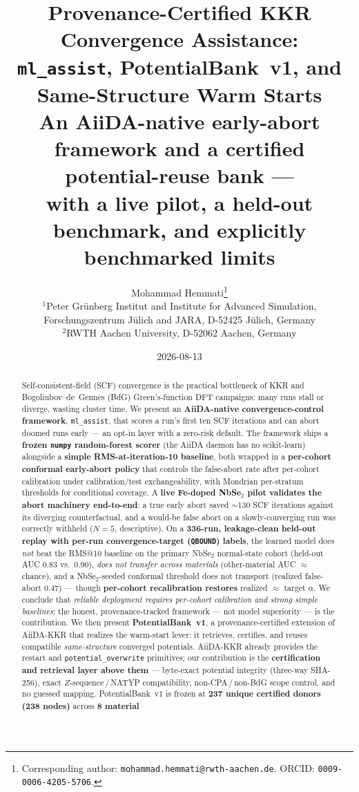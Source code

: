 \documentclass[11pt]{article}
\title{\textbf{Provenance-Certified KKR Convergence Assistance:\\
\texttt{ml\_assist}, PotentialBank~v1, and Same-Structure Warm Starts}\\[3pt]
\large An AiiDA-native early-abort framework and a certified potential-reuse bank ---\\
with a live pilot, a held-out benchmark, and explicitly benchmarked limits}
\author{%
Mohammad Hemmati\thanks{Corresponding author: \texttt{mohammad.hemmati@rwth-aachen.de}.
ORCID: \texttt{0009-0006-4205-5706}.}\\[2pt]
\small $^{1}$Peter Gr\"unberg Institut and Institute for Advanced Simulation, Forschungszentrum J\"ulich and
JARA, D-52425 J\"ulich, Germany\\
\small $^{2}$RWTH Aachen University, D-52062 Aachen, Germany%
}
\date{2026-08-13}
\newcommand{\code}[1]{\texttt{#1}}
\begin{document}
\maketitle

\begin{abstract}
\noindent
Self-consistent-field (SCF) convergence is the practical bottleneck of KKR and Bogoliubov--de~Gennes
(BdG) Green's-function DFT campaigns: many runs stall or diverge, wasting cluster time. We present an
\textbf{AiiDA-native convergence-control framework}, \code{ml\_assist}, that scores a run's first ten SCF
iterations and can abort doomed runs early --- an opt-in layer with a zero-risk default. The framework
ships a \textbf{frozen \code{numpy} random-forest scorer} (the AiiDA daemon has no scikit-learn) alongside
a \textbf{simple RMS-at-iteration-10 baseline}, both wrapped in a \textbf{per-cohort conformal early-abort
policy} that controls the false-abort rate after per-cohort calibration under calibration/test
exchangeability, with Mondrian per-stratum thresholds for conditional coverage.
A \textbf{live Fe-doped NbSe$_2$ pilot validates the abort machinery end-to-end}: a true early abort saved
$\sim$130 SCF iterations against its diverging counterfactual, and a would-be false abort on a
slowly-converging run was correctly withheld ($N{=}5$, descriptive). On a \textbf{336-run, leakage-clean
held-out replay with per-run convergence-target (\code{QBOUND}) labels}, the learned model does
\emph{not} beat the RMS@10 baseline on the primary NbSe$_2$ normal-state cohort (held-out AUC $0.83$
vs.\ $0.90$), \emph{does not transfer across materials} (other-material AUC $\approx$ chance), and a
NbSe$_2$-seeded conformal threshold does not transport (realized false-abort $0.47$) --- though
\textbf{per-cohort recalibration restores} realized $\approx$ target $\alpha$. We conclude that
\emph{reliable deployment requires per-cohort calibration and strong simple baselines}; the honest,
provenance-tracked framework --- not model superiority --- is the contribution.
We then present \textbf{PotentialBank~v1}, a provenance-certified extension of AiiDA-KKR that realizes the
warm-start lever: it retrieves, certifies, and reuses compatible \emph{same-structure} converged potentials.
AiiDA-KKR already provides the restart and \code{potential\_overwrite} primitives; our contribution is the
\textbf{certification and retrieval layer above them} --- byte-exact potential integrity (three-way SHA-256),
exact $Z$-sequence\,/\,NATYP compatibility, non-CPA\,/\,non-BdG scope control, and no guessed mapping.
PotentialBank~v1 is frozen at \textbf{237 unique certified donors (238 nodes)} across \textbf{8 material
}
\end{abstract}
\end{document}
